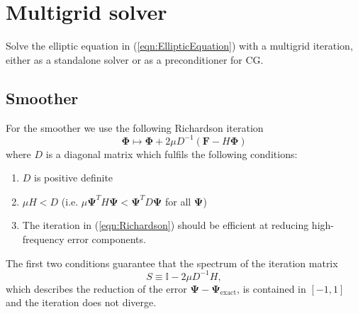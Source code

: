 \documentclass[12pt]{article}
\renewcommand{\vec}[1]{\boldsymbol{#1}}
\begin{document}
\section{Multigrid solver}
Solve the elliptic equation in (\ref{eqn:EllipticEquation}) with a multigrid iteration, either as a standalone solver or as a preconditioner for CG.
\subsection{Smoother}
For the smoother we use the following Richardson iteration
\begin{equation}
  \vec{\Phi} \mapsto \vec{\Phi} + 2\mu D^{-1} \left(\vec{F}-H\vec{\Phi}\right)
  \label{eqn:Richardson}
\end{equation}
where $D$ is a diagonal matrix which fulfils the following conditions:
\begin{enumerate}
  \item $D$ is positive definite 
  \item $\mu H < D$ (i.e. $\mu \vec{\Psi}^T H \vec{\Psi} < \vec{\Psi}^T D \vec{\Psi}$ for all $\vec{\Psi}$)
  \item The iteration in (\ref{eqn:Richardson}) should be efficient at reducing high-frequency error components.
\end{enumerate}
The first two conditions guarantee that the spectrum of the iteration matrix 
\begin{equation}
  S \equiv \mathbb{I} - 2 \mu D^{-1} H,
\end{equation}
which describes the reduction of the error $\vec{\Psi}-\vec{\Psi}_{\operatorname{exact}}$, is contained in $[-1,1]$ and the iteration does not diverge.
\end{document}

